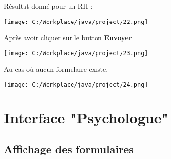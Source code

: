 \documentclass[12]{article}
\begin{document}
Résultat donné pour un RH :

\begin{center}
\texttt{[image: C:/Workplace/java/project/22.png]}
\end{center}

Après avoir cliquer sur le button \textbf{Envoyer}

\begin{center}
\texttt{[image: C:/Workplace/java/project/23.png]}
\end{center}

Au cas où aucun formulaire existe.

\begin{center}
\texttt{[image: C:/Workplace/java/project/24.png]}
\end{center}


\newpage









\section{Interface "Psychologue"}

\subsection{Affichage des formulaires}
\end{document}

